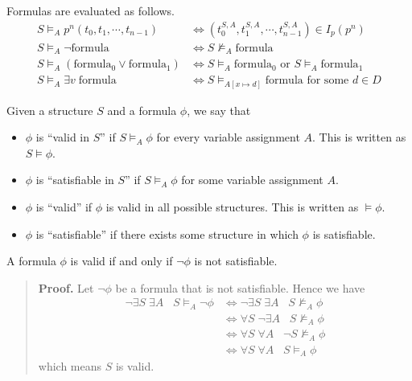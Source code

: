 Formulas are evaluated as follows.
%
\begin{align*}
    S \models_A p^n (t_0, t_1, \cdots, t_{n-1}) &\iff (t_0^{S, A}, t_1^{S, A}, \cdots, t_{n-1}^{S, A}) \in I_p (p^n)\\
    S \models_A \neg \text{formula} &\iff S \not\models_A \text{formula}\\
    S \models_A (\text{formula}_0 \lor \text{formula}_1) &\iff S \models_A \text{formula}_0 \text{ or } S \models_A \text{formula}_1\\
    S \models_A \exists v\; \text{formula} &\iff S \models_{A[x \mapsto d]} \text{formula for some } d \in D
\end{align*}

Given a structure \(S\) and a formula \(\phi\), we say that
%
\begin{itemize}
    \item \(\phi\) is ``valid in \(S\)'' if \(S \models_A \phi\) for every variable assignment \(A\). This is written as \(S \models \phi\).
    \item \(\phi\) is ``satisfiable in \(S\)'' if \(S \models_A \phi\) for some variable assignment \(A\).
    \item \(\phi\) is ``valid'' if \(\phi\) is valid in all possible structures. This is written as \(\models \phi\).
    \item \(\phi\) is ``satisfiable'' if there exists some structure in which \(\phi\) is satisfiable.
\end{itemize}
%
A formula \(\phi\) is valid if and only if \(\neg \phi\) is not satisfiable.
%
\begin{quote}
    \textbf{Proof.} Let \(\neg\phi\) be a formula that is not satisfiable. Hence we have
    \begin{align*}
        \neg \exists S\; \exists A\;\;\; S \models_A \neg\phi &\iff \neg \exists S\; \exists A\;\;\; S \not\models_A \phi\\
        &\iff \forall S\; \neg \exists A\;\;\; S \not\models_A \phi\\
        &\iff \forall S\; \forall A\;\;\;  \neg S \not\models_A \phi\\
        &\iff \forall S\; \forall A\;\;\; S \models_A \phi
    \end{align*}
    which means \(S\) is valid.
\end{quote}

